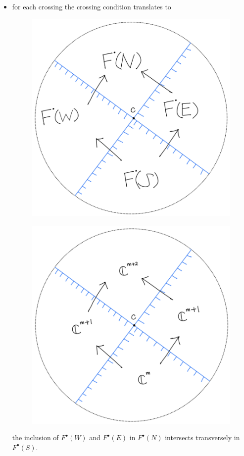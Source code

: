 \begin{itemize}
\item for each crossing the crossing condition translates to
\begin{figure}[H] 
    \centering
    \includegraphics[scale = 0.95]{diagrams/intro/9.png}
    \caption{}
    \label{fig:your-label}
\end{figure}
\begin{figure}[H] 
    \centering
    \includegraphics[scale = 0.95]{diagrams/intro/10.png}
    \caption{}
    \label{fig:your-label}
\end{figure}
the inclusion of $F^\bullet(W)$ and $F^\bullet(E)$ in $F^\bullet(N)$ intersects transversely in $F^\bullet(S)$.
\end{itemize}

